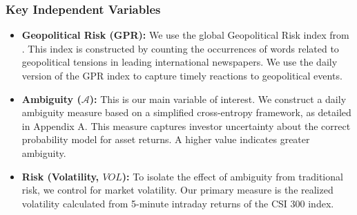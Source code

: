 \documentclass[preprint,12pt,authoryear]{elsarticle}
\begin{document}
\subsubsection{Key Independent Variables}
\begin{itemize}
    \item \textbf{Geopolitical Risk (GPR):} We use the global Geopolitical Risk index from \citet{Caldara2022}. This index is constructed by counting the occurrences of words related to geopolitical tensions in leading international newspapers. We use the daily version of the GPR index to capture timely reactions to geopolitical events.
    \item \textbf{Ambiguity ($\mathcal{A}$):} This is our main variable of interest. We construct a daily ambiguity measure based on a simplified cross-entropy framework, as detailed in Appendix A. This measure captures investor uncertainty about the correct probability model for asset returns. A higher value indicates greater ambiguity.
    \item \textbf{Risk (Volatility, $VOL$):} To isolate the effect of ambiguity from traditional risk, we control for market volatility. Our primary measure is the realized volatility calculated from 5-minute intraday returns of the CSI 300 index.
\end{itemize}
\end{document}
